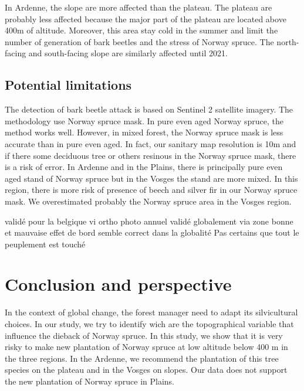 \documentclass[3p,procedia]{elsarticle}
\begin{document}
In Ardenne, the slope are more affected than the plateau. The plateau are probably less affected because the major part of the plateau are located above 400m of altitude.
Moreover, this area stay cold in the summer and limit the number of generation of bark beetles and the stress of Norway spruce.
The north-facing and south-facing slope are similarly affected until 2021. 


 

\subsection{Potential limitations}
The detection of bark beetle attack is based on Sentinel 2 satellite imagery.
The methodology use Norway spruce mask. 
In pure even aged Norway spruce, the method works well. 
However, in mixed forest, the Norway spruce mask is less accurate than in pure even aged.
In fact, our sanitary map resolution is 10m and if there some deciduous tree or others resinous in the Norway spruce mask, there is a risk of error.
In Ardenne and in the Plains, there is principally pure even aged stand of Norway spruce but in the Vosges the stand are more mixed.
In this region, there is more risk of presence of beech and silver fir in our Norway spruce mask.
We overestimated probably the Norway spruce area in the Vosges region.


validé pour la belgique vi ortho photo annuel 
validé globalement via zone bonne et mauvaise
effet de bord
semble correct dans la globalité 
Pas certains que tout le peuplement est touché 
\section{Conclusion and perspective}

In the context of global change, the forest manager need to adapt its silvicultural choices.
In our study, we try to identify wich are the topographical variable that influence the dieback of Norway spruce.
In this study, we show that it is very risky to make new plantation of Norway spruce at low altitude below 400 m in the three regions.
In the Ardenne, we recommend the plantation of this tree species on the plateau and in the Vosges on slopes. 
Our data does not support the new plantation of Norway spruce in Plains. 
\end{document}
